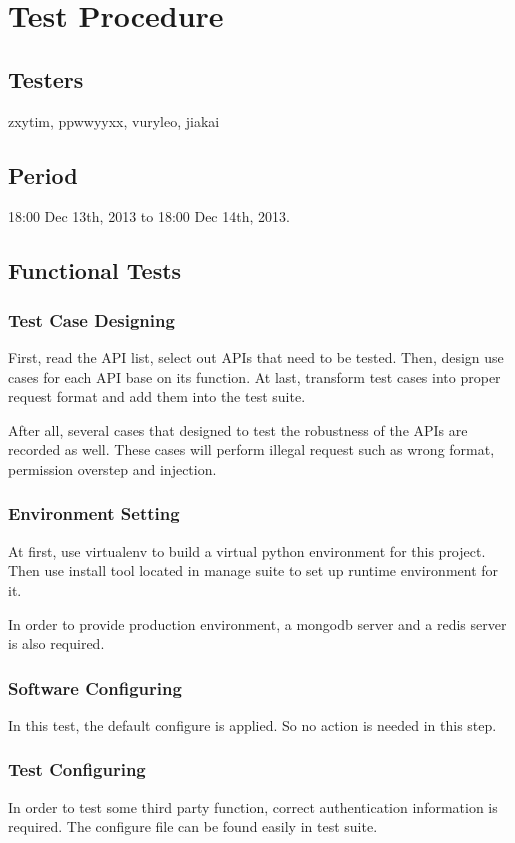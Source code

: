 \section{Test Procedure}
\label{test_procedure}
  \subsection{Testers}
    zxytim, ppwwyyxx, vuryleo, jiakai
  \subsection{Period}
    18:00 Dec 13th, 2013 to 18:00 Dec 14th, 2013.
  \subsection{Functional Tests}
    \subsubsection{Test Case Designing}
      First, read the API list, select out APIs that need to be tested.
      Then, design use cases for each API base on its function.
      At last, transform test cases into proper request format and add them into the test suite.

      After all, several cases that designed to test the robustness of the APIs are recorded as well.
      These cases will perform illegal request such as wrong format, permission overstep and injection.
    \subsubsection{Environment Setting}
      At first, use virtualenv to build a virtual python environment for this project.
      Then use install tool located in manage suite to set up runtime environment for it.

      In order to provide production environment, a mongodb server and a redis server is also required.
    \subsubsection{Software Configuring}
      In this test, the default configure is applied. So no action is needed in this step.
    \subsubsection{Test Configuring}
      In order to test some third party function, correct authentication information is required.
      The configure file can be found easily in test suite.
